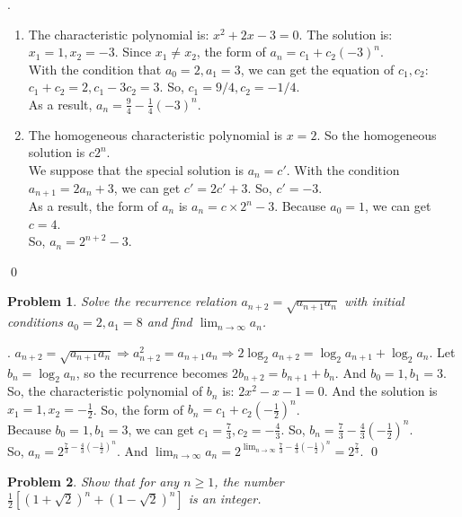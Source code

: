 \documentclass[12pt]{article}
\newtheorem{hw}{Problem}
\newenvironment{sol}
  {\par\vspace{3mm}\noindent{\it Solution}.}
  {\qed}
\begin{document}
\begin{sol}
    \begin{enumerate}
        \item The characteristic polynomial is: $x^2+2x-3=0$. The solution is: $x_1=1,x_2=-3$. Since $x_1\neq x_2$, the form of $a_n=c_1+c_2(-3)^n$.
        \\ With the condition that $a_0=2,a_1=3$, we can get the equation of $c_1,c_2$: $c_1+c_2=2,c_1-3c_2=3$. So, $c_1=9/4,c_2=-1/4$.
        \\ As a result, $a_n=\frac{9}{4}-\frac{1}{4}(-3)^n  $.
        \item The homogeneous characteristic polynomial is $x=2$. So the homogeneous solution is $c2^n$.
        \\ We suppose that the special solution is $a_n=c'$. With the condition $a_{n+1}=2a_n+3$, we can get $c'=2c'+3$. So, $c'=-3$.
        \\ As a result, the form of $a_n$ is $a_n=c\times 2^n-3$. Because $a_0=1$, we can get $c=4$.
        \\ So, $a_n=2^{n+2}-3$.
    \end{enumerate}
\end{sol}


\begin{hw}
Solve the recurrence relation $a_{n+2}=\sqrt{a_{n+1}a_n}$ with initial conditions $a_0=2, a_1=8$ and find $\lim_{n\rightarrow \infty}a_n $.
\end{hw}

\begin{sol}
    $a_{n+2}=\sqrt{a_{n+1}a_n} \Rightarrow a_{n+2}^2=a_{n+1}a_n\Rightarrow 2\log_2 a_{n+2}=\log_2 a_{n+1}+\log_2 a_n$. Let $b_n=\log_2 a_n$, so the recurrence becomes $2b_{n+2}=b_{n+1}+b_n$. And $b_0=1,b_1=3$.
    \\So, the characteristic polynomial of $b_n$ is: $2x^2-x-1=0$. And the solution is $x_1=1,x_2=-\frac{1}{2} $. So, the form of $b_n=c_1+c_2(-\frac{1}{2})^n $.
    \\Because $b_0=1,b_1=3$, we can get $c_1=\frac{7}{3},c_2=-\frac{4}{3}  $. So, $b_n=\frac{7}{3}-\frac{4}{3}(-\frac{1}{2} )^n  $.
    \\ So, $a_n=2^{\frac{7}{3}-\frac{4}{3}(-\frac{1}{2} )^n}$. And $\lim_{n\rightarrow \infty}a_n =2^{\lim_{n\rightarrow \infty}\frac{7}{3}-\frac{4}{3}(-\frac{1}{2} )^n}=2^\frac{7}{3} $.
\end{sol}

\begin{hw}
Show that for any $n\geq 1$, the number $\frac{1}{2}[(1+\sqrt{2})^n+(1-\sqrt{2})^n]$ is an integer.
\end{hw}
\end{document}

